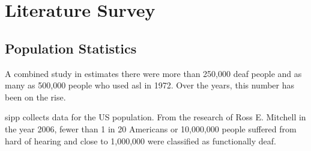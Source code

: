 \documentclass[twocolumn]{article}
\begin{document}
\section{Literature Survey}

\subsection{Population Statistics}
A combined study in \cite{mitchell2006many} estimates there were more than 
250,000 deaf people and as many as 500,000 people who used \gls{asl} in 1972. 
Over the years, this number has been on the rise.

\gls{sipp} collects data for the US population. From the research of 
Ross E. Mitchell \cite{mitchell2006many} in the year 2006, fewer than 1 in 20 
Americans or 10,000,000 people suffered from hard of hearing and close to 
1,000,000 were classified as functionally deaf.




\glsaddall
\printglossary[type=\acronymtype,title=List Of Abbreviations]
\end{document}
